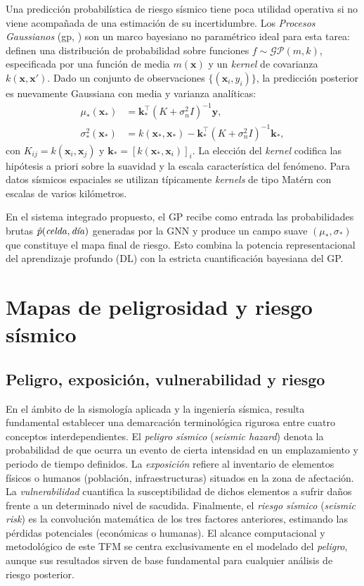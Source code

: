 Una predicción probabilística de riesgo sísmico tiene poca utilidad operativa si no viene acompañada de una estimación de su incertidumbre. Los \emph{Procesos Gaussianos} (\gls{gp}, \citep{rasmussen2006gp}) son un marco bayesiano no paramétrico ideal para esta tarea: definen una distribución de probabilidad sobre funciones $f \sim \mathcal{GP}(m, k)$, especificada por una función de media $m(\mathbf{x})$ y un \textit{kernel} de covarianza $k(\mathbf{x}, \mathbf{x}')$. Dado un conjunto de observaciones $\{(\mathbf{x}_i, y_i)\}$, la predicción posterior es nuevamente Gaussiana con media y varianza analíticas:
\begin{align}
  \mu_*(\mathbf{x}_*)      & = \mathbf{k}_*^\top (K + \sigma_n^2 I)^{-1} \mathbf{y},                                   \\
  \sigma_*^2(\mathbf{x}_*) & = k(\mathbf{x}_*, \mathbf{x}_*) - \mathbf{k}_*^\top (K + \sigma_n^2 I)^{-1} \mathbf{k}_*,
\end{align}
con $K_{ij} = k(\mathbf{x}_i, \mathbf{x}_j)$ y $\mathbf{k}_* = [k(\mathbf{x}_*, \mathbf{x}_i)]_i$. La elección del \textit{kernel} codifica las hipótesis a priori sobre la suavidad y la escala característica del fenómeno. Para datos sísmicos espaciales se utilizan típicamente \textit{kernels} de tipo Matérn con escalas de varios kilómetros.

En el sistema integrado propuesto, el GP recibe como entrada las probabilidades brutas $\hat{p}(\text{\emph{celda}}, \text{\emph{día}})$ generadas por la GNN y produce un campo suave $(\mu_*, \sigma_*)$ que constituye el mapa final de riesgo. Esto combina la potencia representacional del aprendizaje profundo (DL) con la estricta cuantificación bayesiana del GP.

\section{Mapas de peligrosidad y riesgo sísmico}
\label{mapas-riesgo}

\subsection{Peligro, exposición, vulnerabilidad y riesgo}
En el ámbito de la sismología aplicada y la ingeniería sísmica, resulta fundamental establecer una demarcación terminológica rigurosa entre cuatro conceptos interdependientes. El \emph{peligro sísmico} (\textit{seismic hazard}) denota la probabilidad de que ocurra un evento de cierta intensidad en un emplazamiento y periodo de tiempo definidos. La \emph{exposición} refiere al inventario de elementos físicos o humanos (población, infraestructuras) situados en la zona de afectación. La \emph{vulnerabilidad} cuantifica la susceptibilidad de dichos elementos a sufrir daños frente a un determinado nivel de sacudida. Finalmente, el \emph{riesgo sísmico} (\textit{seismic risk}) es la convolución matemática de los tres factores anteriores, estimando las pérdidas potenciales (económicas o humanas). El alcance computacional y metodológico de este TFM se centra exclusivamente en el modelado del \emph{peligro}, aunque sus resultados sirven de base fundamental para cualquier análisis de riesgo posterior.

